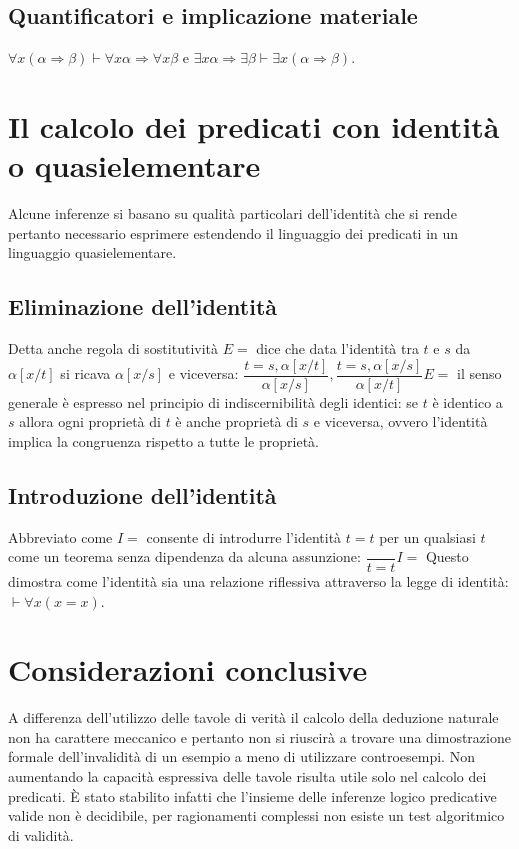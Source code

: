 \subsection{Quantificatori e implicazione materiale}
$\forall x(\alpha\Rightarrow\beta)\vdash\forall x\alpha\Rightarrow\forall x\beta$ e $\exists x\alpha\Rightarrow\exists\beta\vdash\exists x(\alpha\Rightarrow \beta)$.
\section{Il calcolo dei predicati con identit\`a o quasielementare}
Alcune inferenze si basano su qualit\`a particolari dell'identit\`a che si rende pertanto necessario esprimere estendendo il linguaggio dei predicati in un linguaggio quasielementare. 
\subsection{Eliminazione dell'identit\`a}
Detta anche regola di sostitutivit\`a $E=$ dice che data l'identit\`a tra $t$ e $s$ da $\alpha[x/t]$ si ricava $\alpha[x/s]$ e viceversa: $\dfrac{t=s, \alpha[x/t]}{\alpha[x/s]}, \dfrac{t=s, \alpha[x/s]}{\alpha[x/t]}
E=$ il senso generale \`e espresso nel principio di indiscernibilit\`a degli identici: se $t$ \`e identico a $s$ allora ogni propriet\`a di $t$ \`e anche propriet\`a di $s$ e viceversa, ovvero l'identit\`a implica la 
congruenza rispetto a tutte le propriet\`a. 
\subsection{Introduzione dell'identit\`a}
Abbreviato come $I=$ consente di introdurre l'identit\`a $t=t$ per un qualsiasi $t$ come un teorema senza dipendenza da alcuna assunzione: $\dfrac{}{t=t}I=$ Questo dimostra come l'identit\`a sia una 
relazione riflessiva attraverso la legge di identit\`a: $\vdash\forall x(x=x)$. 
\section{Considerazioni conclusive}
A differenza dell'utilizzo delle tavole di verit\`a il calcolo della deduzione naturale non ha carattere meccanico e pertanto non si riuscir\`a a trovare una dimostrazione formale dell'invalidit\`a di un esempio a 
meno di utilizzare controesempi. Non aumentando la capacit\`a espressiva delle tavole risulta utile solo nel calcolo dei predicati. \`E stato stabilito infatti che l'insieme delle inferenze logico predicative valide 
non \`e decidibile, per ragionamenti complessi non esiste un test algoritmico di validit\`a. 